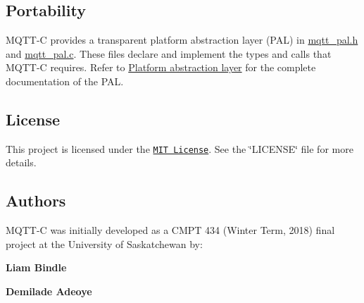 \subsection*{Portability}

M\+Q\+T\+T-\/C provides a transparent platform abstraction layer (P\+AL) in {\ttfamily \hyperlink{mqtt__pal_8h}{mqtt\+\_\+pal.\+h}} and {\ttfamily \hyperlink{mqtt__pal_8c}{mqtt\+\_\+pal.\+c}}. These files declare and implement the types and calls that M\+Q\+T\+T-\/C requires. Refer to \hyperlink{group__pal}{Platform abstraction layer} for the complete documentation of the P\+AL.

\subsection*{License}

This project is licensed under the \href{https://opensource.org/licenses/MIT}{\tt M\+IT License}. See the {\ttfamily \char`\"{}\+L\+I\+C\+E\+N\+S\+E\char`\"{}} file for more details.

\subsection*{Authors}

M\+Q\+T\+T-\/C was initially developed as a C\+M\+PT 434 (Winter Term, 2018) final project at the University of Saskatchewan by\+:
\begin{DoxyItemize}
\item {\bfseries Liam Bindle}
\item {\bfseries Demilade Adeoye} 
\end{DoxyItemize}